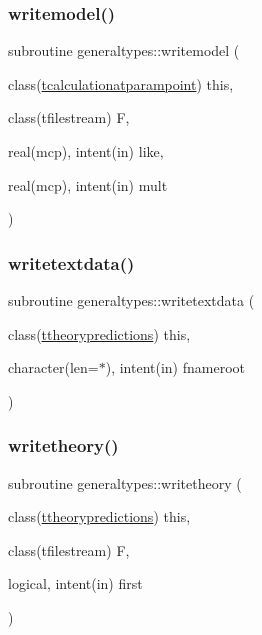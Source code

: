 \subsubsection{\texorpdfstring{writemodel()}{writemodel()}}
{\footnotesize\ttfamily subroutine generaltypes\+::writemodel (\begin{DoxyParamCaption}\item[{class(\mbox{\hyperlink{structgeneraltypes_1_1tcalculationatparampoint}{tcalculationatparampoint}})}]{this,  }\item[{class(tfilestream)}]{F,  }\item[{real(mcp), intent(in)}]{like,  }\item[{real(mcp), intent(in)}]{mult }\end{DoxyParamCaption})\hspace{0.3cm}{\ttfamily [private]}}

\mbox{\label{namespacegeneraltypes_a845e7a28effceab63f5aed42a4bf066a}} 
\subsubsection{\texorpdfstring{writetextdata()}{writetextdata()}}
{\footnotesize\ttfamily subroutine generaltypes\+::writetextdata (\begin{DoxyParamCaption}\item[{class(\mbox{\hyperlink{structgeneraltypes_1_1ttheorypredictions}{ttheorypredictions}})}]{this,  }\item[{character(len=$\ast$), intent(in)}]{fnameroot }\end{DoxyParamCaption})\hspace{0.3cm}{\ttfamily [private]}}

\mbox{\label{namespacegeneraltypes_a739d15405356622a778b42627a1d39d4}} 
\subsubsection{\texorpdfstring{writetheory()}{writetheory()}}
{\footnotesize\ttfamily subroutine generaltypes\+::writetheory (\begin{DoxyParamCaption}\item[{class(\mbox{\hyperlink{structgeneraltypes_1_1ttheorypredictions}{ttheorypredictions}})}]{this,  }\item[{class(tfilestream)}]{F,  }\item[{logical, intent(in)}]{first }\end{DoxyParamCaption})\hspace{0.3cm}{\ttfamily [private]}}




